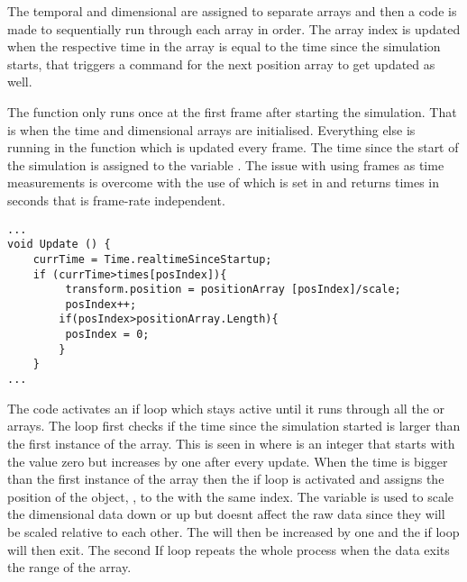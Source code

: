 The temporal and dimensional are assigned to separate arrays and then a code is made to sequentially run through each array in order. The array index is updated when the respective time in the array is equal to the time since the simulation starts, that triggers a command for the next position array to get updated as well.

The  function only runs once at the first frame after starting the simulation. That is when the time and dimensional arrays are initialised. Everything else is running in the function  which is updated every frame. The time since the start of the simulation is assigned to the variable . The issue with using frames as time measurements is overcome with the use of  which is set in  and returns times in seconds that is frame-rate independent. 

\bigskip
\begin{code1}
\begin{verbatim}
...
void Update () {
	currTime = Time.realtimeSinceStartup;
	if (currTime>times[posIndex]){
         transform.position = positionArray [posIndex]/scale;
         posIndex++;
        if(posIndex>positionArray.Length){
         posIndex = 0;
        }
    }
...
\end{verbatim}
\label{code:c-code}
\end{code1}

 The code activates an if loop which stays active until it runs through all the  or  arrays. The loop first checks if the time since the simulation started is larger than the first instance of the  array. This is seen in  where  is an integer that starts with the value zero but increases by one after every update. When the time is bigger than the first instance of the  array then the if loop is activated and assigns the position of the object, , to the  with the same index. The  variable is used to scale the dimensional data down or up but doesnt affect the raw data since they will be scaled relative to each other. The  will then be increased by one and the if loop will then exit. The second If loop repeats the whole process when the data exits the range of the array. 
 
